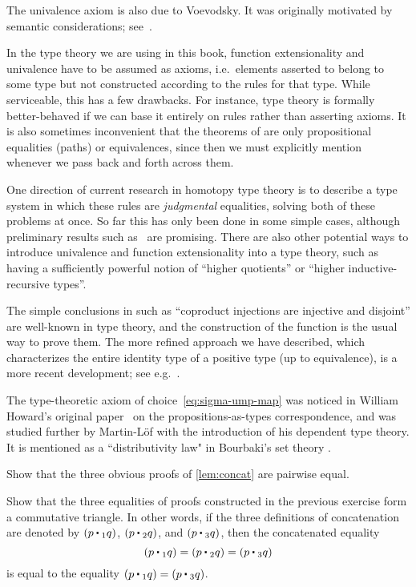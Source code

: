 The univalence axiom is also due to Voevodsky.
It was originally motivated by semantic considerations; see~\cite{klv:ssetmodel}.

In the type theory we are using in this book, function extensionality and univalence have to be assumed as axioms, i.e.\ elements asserted to belong to some type but not constructed according to the rules for that type.
While serviceable, this has a few drawbacks.
For instance, type theory is formally better-behaved if we can base it entirely on rules rather than asserting axioms.
It is also sometimes inconvenient that the theorems of  are only propositional equalities (paths) or equivalences, since then we must explicitly mention whenever we pass back and forth across them.

One direction of current research in homotopy type theory is to describe a type system in which these rules are \emph{judgmental} equalities, solving both of these problems at once.
So far this has only been done in some simple cases, although preliminary results such as~\cite{lh:canonicity} are promising.
There are also other potential ways to introduce univalence and function extensionality into a type theory, such as having a sufficiently powerful notion of ``higher quotients'' or ``higher inductive-recursive types''.

The simple conclusions in  such as ``coproduct injections are injective and disjoint'' are well-known in type theory, and the construction of the function \encode is the usual way to prove them.
The more refined approach we have described, which characterizes the entire identity type of a positive type (up to equivalence), is a more recent development; see e.g.~\cite{ls:pi1s1}.

The type-theoretic axiom of choice~\eqref{eq:sigma-ump-map} was noticed in William Howard's original paper~\cite{howard:pat} on the propositions-as-types correspondence, and was studied further by Martin-L\"of with the introduction of his dependent type theory.  It is mentioned as a ``distributivity law" in Bourbaki's set theory \cite{Bourbaki}.

\sectionExercises

\begin{ex}\label{ex:basics:concat}
  Show that the three obvious proofs of \autoref{lem:concat} are pairwise equal.
\end{ex}

\begin{ex}
  Show that the three equalities of proofs constructed in the previous exercise form a commutative triangle.
  In other words, if the three definitions of concatenation are denoted by $(p \ct_1 q)$, $(p\ct_2 q)$, and $(p\ct_3 q)$, then the concatenated equality
  \[(p\ct_1 q) = (p\ct_2 q) = (p\ct_3 q)\]
  is equal to the equality $(p\ct_1 q) = (p\ct_3 q)$.
\end{ex}

